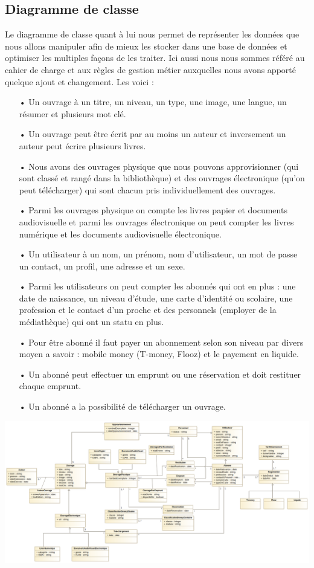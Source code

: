 \documentclass[14pt,a4paper]{article}
\begin{document}
\subsection{Diagramme de classe}
Le diagramme de classe quant à lui nous permet de représenter les données que nous 
allons manipuler afin de mieux les stocker dans une base de données et optimiser les multiples
façons de les traiter. Ici aussi nous nous sommes référé au cahier de charge et 
aux règles de gestion métier auxquelles nous avons apporté quelque ajout et changement.
Les voici :
\begin{itemize}
\item[•] Un ouvrage à un titre, un niveau, un type, une image, une langue, un résumer et
plusieurs mot clé.
\item[•] Un ouvrage peut être écrit par au moins un auteur et inversement un auteur peut
écrire plusieurs livres.
\item[•] Nous avons des ouvrages physique que nous pouvons approvisionner (qui sont
classé et rangé dans la bibliothèque) et des ouvrages électronique (qu'on peut 
télécharger) qui sont chacun pris individuellement des ouvrages.
\item[•] Parmi les ouvrages physique on compte les livres papier et documents
audiovisuelle et parmi les ouvrages électronique on peut compter les livres numérique
et les documents audiovisuelle électronique.
\item[•] Un utilisateur à un nom, un prénom, nom d'utilisateur, un mot de passe un 
contact, un profil, une adresse et un sexe.
\item[•] Parmi les utilisateurs on peut compter les abonnés qui ont en plus : une date
de naissance, un niveau d'étude, une carte d'identité ou scolaire, une profession et le
contact d'un proche et des personnels (employer de la médiathèque) qui ont un statu en 
plus. 
\item[•] Pour être abonné il faut payer un abonnement selon son niveau par divers moyen
a savoir : mobile money (T-money, Flooz) et le payement en liquide.
\item[•] Un abonné peut effectuer un emprunt ou une réservation et doit restituer
chaque emprunt.
\item[•] Un abonné a la possibilité de télécharger un ouvrage.
\end{itemize}
\newpage
\includegraphics[scale=0.25]{images/CD.png}
\newpage
\end{document}
